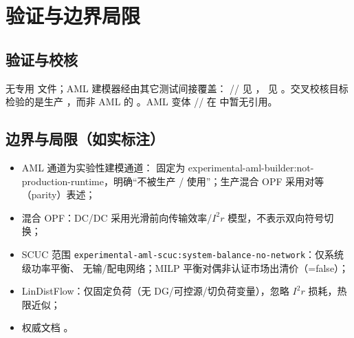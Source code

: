 \documentclass[UTF8,fontset=fandol,a4paper,11pt]{ctexart}
\begin{document}
\section{验证与边界局限}
\subsection{验证与校核}
无专用  文件；AML 建模器经由其它测试间接覆盖：
// 见
， 见
。交叉校核目标  检验的是生产
，而非 AML 的 。AML 变体
// 在  中暂无引用。

\subsection{边界与局限（如实标注）}
\begin{itemize}
  \item AML 通道为实验性建模通道： 固定为
        experimental-aml-builder:not-production-runtime，明确“不被生产 /
         使用”；生产混合 OPF 采用对等（parity）表述；
  \item 混合 OPF：DC/DC 采用光滑前向传输效率/$I^2r$ 模型，不表示双向符号切换；
  \item SCUC 范围 \texttt{experimental-aml-scuc:system-balance-no-network}：仅系统级功率平衡、
        无输/配电网络；MILP 平衡对偶非认证市场出清价（=false）；
  \item LinDistFlow：仅固定负荷（无 DG/可控源/切负荷变量），忽略 $I^2r$ 损耗，热限近似；
  \item 权威文档 。
\end{itemize}

\end{document}
